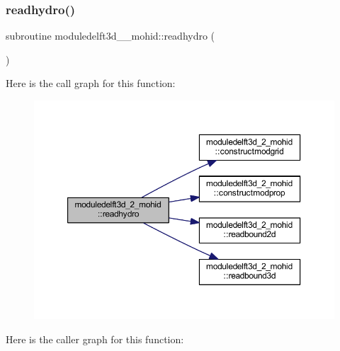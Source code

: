 \subsubsection{\texorpdfstring{readhydro()}{readhydro()}}
{\footnotesize\ttfamily subroutine moduledelft3d\+\_\+\_\+mohid\+::readhydro (\begin{DoxyParamCaption}{ }\end{DoxyParamCaption})\hspace{0.3cm}{\ttfamily [private]}}

Here is the call graph for this function\+:\nopagebreak
\begin{figure}[H]
\begin{center}
\leavevmode
\includegraphics[width=350pt]{namespacemoduledelft3d__2__mohid_a04640ef3827cfdf73681b2b4ed0f3884_cgraph}
\end{center}
\end{figure}
Here is the caller graph for this function\+:\nopagebreak
